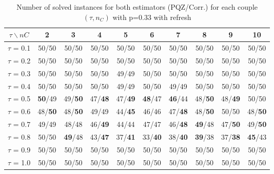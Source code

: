 \begin{table}[H]
\centering

\begin{tabular}{|c|c|c|c|c|c|c|c|c|c|}
\hline
$\tau \backslash nC$ & 2 & 3 & 4 & 5 & 6 & 7 & 8 & 9 & 10 \\
\hline
$\tau$ = 0.1 & 50/50 & 50/50 & 50/50 & 50/50 & 50/50 & 50/50 & 50/50 & 50/50 & 50/50 \\
\hline
$\tau$ = 0.2 & 50/50 & 50/50 & 50/50 & 50/50 & 50/50 & 50/50 & 50/50 & 50/50 & 50/50 \\
\hline
$\tau$ = 0.3 & 50/50 & 50/50 & 50/50 & 49/49 & 50/50 & 50/50 & 50/50 & 50/50 & 50/50 \\
\hline
$\tau$ = 0.4 & 50/50 & 50/50 & 50/50 & 49/49 & 50/50 & 49/49 & 50/50 & 50/50 & 50/50 \\
\hline
$\tau$ = 0.5 & \textbf{50}/49 & 49/\textbf{50} & 47/\textbf{48} & 47/\textbf{49} & \textbf{48}/47 & \textbf{46}/44 & 48/\textbf{50} & 48/\textbf{49} & 50/50 \\
\hline
$\tau$ = 0.6 & 48/\textbf{50} & 48/\textbf{50} & 49/49 & 44/\textbf{45} & 46/46 & 47/\textbf{48} & 48/\textbf{50} & 50/50 & 48/\textbf{50} \\
\hline
$\tau$ = 0.7 & 49/49 & 48/48 & 46/\textbf{49} & 44/44 & 47/47 & 46/\textbf{48} & \textbf{49}/48 & 47/\textbf{50} & 49/\textbf{50} \\
\hline
$\tau$ = 0.8 & 50/50 & \textbf{49}/48 & 43/\textbf{47} & 37/\textbf{41} & 33/\textbf{40} & 38/\textbf{40} & \textbf{39}/38 & 37/\textbf{38} & \textbf{45}/43 \\
\hline
$\tau$ = 0.9 & 50/50 & 50/50 & 50/50 & 50/50 & 50/50 & 50/50 & 50/50 & 50/50 & 50/50 \\
\hline
$\tau$ = 1.0 & 50/50 & 50/50 & 50/50 & 50/50 & 50/50 & 50/50 & 50/50 & 50/50 & 50/50 \\
\hline
\end{tabular}


~	\caption{Number of solved instances for both estimators (PQZ/Corr.) for each couple $(\tau, n_C)$ with p=0.33 with refresh}
    \label{nbSolved033Refresh}
\end{table}
